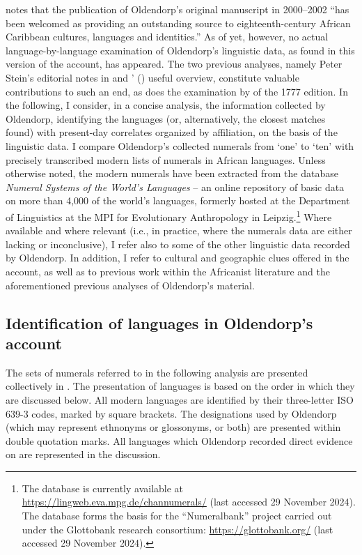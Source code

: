 \documentclass[output=paper,colorlinks,citecolor=brown]{langscibook}
\begin{document}
\citet[194]{Ahlback_2016} notes that the publication of Oldendorp’s original manuscript in 2000–2002 “has been welcomed as providing an outstanding source to eighteenth-century African Caribbean cultures, languages and identities.” As of yet, however, no actual language-by-language examination of Oldendorp’s linguistic data, as found in this version of the account, has appeared. The two previous analyses, namely Peter Stein’s editorial notes in \citet{Oldendorp_2000} and \citeauthor{Jones_2010}’ (\citeyear{Jones_2010}) useful overview, constitute valuable contributions to such an end, as does the examination by \citet{Fodor_1975} of the 1777 edition. In the following, I consider, in a concise analysis, the information collected by Oldendorp, identifying the languages (or, alternatively, the closest matches found) with present-day correlates organized by affiliation, on the basis of the linguistic data. I compare Oldendorp's collected numerals from `one' to `ten' with precisely transcribed modern lists of numerals in African languages. Unless otherwise noted, the modern numerals have been extracted from the database \emph{Numeral Systems of the World’s Languages} – an online repository of basic data on more than 4,000 of the world’s languages, formerly hosted at the Department of Linguistics at the MPI for Evolutionary Anthropology in Leipzig.\footnote{The database is currently available at \url{https://lingweb.eva.mpg.de/channumerals/} (last accessed 29 November 2024). The database forms the basis for the ``Numeralbank'' project carried out under the Glottobank research consortium: \url{https://glottobank.org/} (last accessed 29 November 2024).} Where available and where relevant (i.e., in practice, where the numerals data are either lacking or inconclusive), I refer also to some of the other linguistic data recorded by Oldendorp. In addition, I refer to cultural and geographic clues offered in the account, as well as to previous work within the Africanist literature and the aforementioned previous analyses of Oldendorp’s material.

\subsection{Identification of languages in Oldendorp's account}

The sets of numerals referred to in the following analysis are presented collectively in . The presentation of languages is based on the order in which they are discussed below. All modern languages are identified by their three-letter ISO 639-3 codes, marked by square brackets. The designations used by Oldendorp (which may represent ethnonyms or glossonyms, or both) are presented within double quotation marks. All languages which Oldendorp recorded direct evidence on are represented in the discussion.
\end{document}
